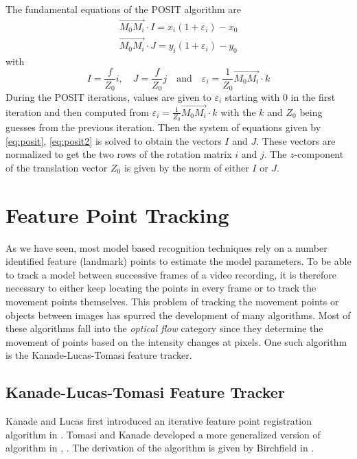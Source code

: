 \documentclass[11pt,a4paper,twoside]{report}
\begin{document}
The fundamental equations of the POSIT algorithm are
\begin{gather}\label{eq:posit}
\overrightarrow{M_0M_i}\cdot I  = x_i(1+\varepsilon_i) - x_0\\
\label{eq:posit2}
\overrightarrow{M_0M_i}\cdot J  = y_i(1+\varepsilon_i) - y_0
\end{gather}
with
\begin{equation*}
I = \frac{f}{Z_0}i \mathrm{, }\quad J = \frac{f}{Z_0}j \quad \mathrm{and} \quad
\varepsilon_i = \frac{1}{Z_0}\overrightarrow{M_0M_i} \cdot k
\end{equation*}
During the POSIT iterations, values are given to $\varepsilon_i$ starting with
0 in the first iteration and then computed from $\varepsilon_i =
\frac{1}{Z_0}\overrightarrow{M_0M_i} \cdot k$ with the $k$ and $Z_0$ being guesses from the
previous iteration. Then the system of equations given by \ref{eq:posit},
\ref{eq:posit2} is solved to obtain the vectors $I$ and $J$. These vectors are
normalized to get the two rows of the rotation matrix $i$ and $j$. The
$z$-component of the translation vector $Z_0$ is given by the norm of either $I$
or $J$.

\section{Feature Point Tracking}
As we have seen, most model based recognition techniques rely on a number identified feature
(landmark) points to estimate the model parameters. To be able to track a model
between successive frames of a video recording, it is therefore necessary to
either keep locating the points in every frame or to track the movement points
themselves. This problem of tracking the movement points or objects between
images has spurred the development of many algorithms. Most of these algorithms
fall into the \textit{optical flow} category since they determine the movement
of points based on the intensity changes at pixels. One such algorithm is the
Kanade-Lucas-Tomasi feature tracker.
\subsection{Kanade-Lucas-Tomasi Feature Tracker}\label{s:kanade}
Kanade and Lucas first introduced an iterative feature point registration algorithm in
\cite{kanade}. Tomasi and Kanade developed a more generalized version of
algorithm in \cite{kanade2}, \cite{kanade3}. The derivation of the algorithm is
given by Birchfield in \cite{kanade4}.
\end{document}
